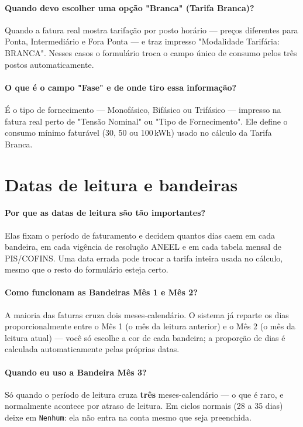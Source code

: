 \documentclass[11pt,a4paper]{article}
\newcommand{\campo}[1]{\texttt{\small #1}}
\begin{document}
\paragraph{Quando devo escolher uma opção "Branca" (Tarifa Branca)?}
Quando a fatura real mostra tarifação por posto horário --- preços diferentes para Ponta, Intermediário e Fora Ponta --- e traz impresso "Modalidade Tarifária: BRANCA". Nesses casos o formulário troca o campo único de consumo pelos três postos automaticamente.

\paragraph{O que é o campo "Fase" e de onde tiro essa informação?}
É o tipo de fornecimento --- Monofásico, Bifásico ou Trifásico --- impresso na fatura real perto de "Tensão Nominal" ou "Tipo de Fornecimento". Ele define o consumo mínimo faturável (30, 50 ou 100\,kWh) usado no cálculo da Tarifa Branca.

\section{Datas de leitura e bandeiras}

\paragraph{Por que as datas de leitura são tão importantes?}
Elas fixam o período de faturamento e decidem quantos dias caem em cada bandeira, em cada vigência de resolução ANEEL e em cada tabela mensal de PIS/COFINS. Uma data errada pode trocar a tarifa inteira usada no cálculo, mesmo que o resto do formulário esteja certo.

\paragraph{Como funcionam as Bandeiras Mês 1 e Mês 2?}
A maioria das faturas cruza dois meses-calendário. O sistema já reparte os dias proporcionalmente entre o Mês 1 (o mês da leitura anterior) e o Mês 2 (o mês da leitura atual) --- você só escolhe a cor de cada bandeira; a proporção de dias é calculada automaticamente pelas próprias datas.

\paragraph{Quando eu uso a Bandeira Mês 3?}
Só quando o período de leitura cruza \textbf{três} meses-calendário --- o que é raro, e normalmente acontece por atraso de leitura. Em ciclos normais (28 a 35 dias) deixe em \campo{Nenhum}: ela não entra na conta mesmo que seja preenchida.
\end{document}
